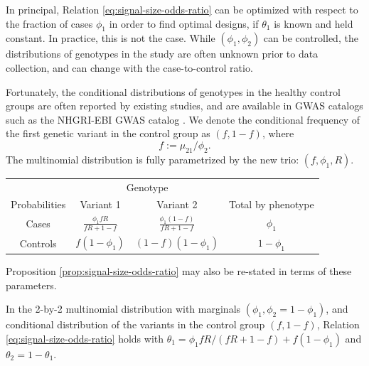 In principal, Relation \eqref{eq:signal-size-odds-ratio} can be optimized with respect to the fraction of cases $\phi_1$ in order to find optimal designs, if $\theta_1$ is known and held constant.
In practice, this is not the case.
While $(\phi_1, \phi_2)$ can be controlled, the distributions of genotypes in the study are often unknown prior to data collection, and can change with the case-to-control ratio.

Fortunately, the conditional distributions of genotypes in the healthy control groups are often reported by existing studies, and are available in GWAS catalogs such as the NHGRI-EBI GWAS catalog \cite{macarthur2016new}.
We denote the conditional frequency of the first genetic variant in the control group as $(f, 1-f)$, where
$$
f := \mu_{21} / \phi_2.
$$
The multinomial distribution is fully parametrized by the new trio: $(f, \phi_1, R)$.
\begin{center}
    \begin{tabular}{cccc}
    \hline
    & \multicolumn{2}{c}{Genotype} \\
    \cline{2-3}
    Probabilities & Variant 1 & Variant 2 & Total by phenotype \\
    \hline
    Cases & $\frac{\phi_1fR}{fR+1-f}$ & $\frac{\phi_1(1-f)}{fR+1-f}$ & $\phi_1$ \\
    Controls & $f(1-\phi_1)$ & $(1-f)(1-\phi_1)$ & $1-\phi_1$ \\
    \hline
    \end{tabular}
\end{center}
Proposition \ref{prop:signal-size-odds-ratio} may also be re-stated in terms of these parameters.


\begin{corollary} \label{cor:signal-size-odds-ratio-conditional-frequency}
In the 2-by-2 multinomial distribution with marginals $(\phi_1, \phi_2 = 1-\phi_1)$, and conditional distribution of the variants in the control group $(f, 1-f)$,
Relation \eqref{eq:signal-size-odds-ratio} holds with $\theta_1 = {\phi_1fR}/{(fR+1-f)} + f(1-\phi_1)$ and $\theta_2 = 1-\theta_1$.
\end{corollary} 

